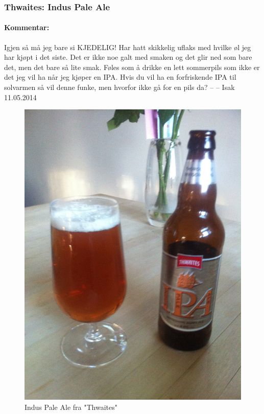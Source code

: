\documentclass[12pt,a4paper,oneside,norsk]{article}
\begin{document}
\newpage
\subsubsection{Thwaites: Indus Pale Ale}
\paragraph{Kommentar:} Igjen så må jeg bare si KJEDELIG! Har hatt skikkelig uflaks med hvilke øl jeg har kjøpt i det siste. Det er ikke noe galt med smaken og det glir ned som bare det, men det bare så lite smak. Føles som å drikke en lett sommerpils som ikke er det jeg vil ha når jeg kjøper en IPA. Hvis du vil ha en forfriskende IPA til solvarmen så vil denne funke, men hvorfor ikke gå for en pils da?
\newline
-- -- Isak 11.05.2014

\begin{figure} [H]
\centering
\includegraphics[scale=0.1, angle=270]{Bilder/Ol/ThwaitesIndusPaleAle.jpg}
\caption{Indus Pale Ale fra "Thwaites"}
\end{figure}
\end{document}
